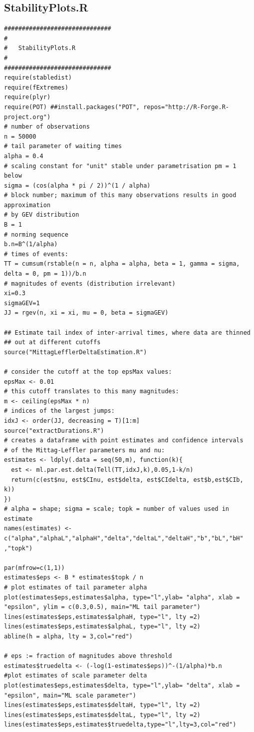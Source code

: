 \documentclass[honours,12pt]{unswthesis}
\newcommand{\1}{\mathbf 1}
\numberwithin{equation}{section}
\theoremstyle{definition}
\theoremstyle{remark}
\begin{document}
\begin{appendices}
\section{StabilityPlots.R}
\begin{lstlisting}
##############################
#
#	StabilityPlots.R
#
##############################
require(stabledist)
require(fExtremes)
require(plyr)
require(POT) ##install.packages("POT", repos="http://R-Forge.R-project.org") 
# number of observations
n = 50000
# tail parameter of waiting times
alpha = 0.4
# scaling constant for "unit" stable under parametrisation pm = 1 below
sigma = (cos(alpha * pi / 2))^(1 / alpha)
# block number; maximum of this many observations results in good approximation
# by GEV distribution
B = 1
# norming sequence
b.n=B^(1/alpha)
# times of events:
TT = cumsum(rstable(n = n, alpha = alpha, beta = 1, gamma = sigma, delta = 0, pm = 1))/b.n
# magnitudes of events (distribution irrelevant)
xi=0.3
sigmaGEV=1
JJ = rgev(n, xi = xi, mu = 0, beta = sigmaGEV)

## Estimate tail index of inter-arrival times, where data are thinned
## out at different cutoffs
source("MittagLefflerDeltaEstimation.R")

# consider the cutoff at the top epsMax values:
epsMax <- 0.01
# this cutoff translates to this many magnitudes:
m <- ceiling(epsMax * n)
# indices of the largest jumps:
idxJ <- order(JJ, decreasing = T)[1:m]
source("extractDurations.R")
# creates a dataframe with point estimates and confidence intervals
# of the Mittag-Leffler parameters mu and nu:
estimates <- ldply(.data = seq(50,m), function(k){
  est <- ml.par.est.delta(Tell(TT,idxJ,k),0.05,1-k/n)
  return(c(est$nu, est$CInu, est$delta, est$CIdelta, est$b,est$CIb, k))
})
# alpha = shape; sigma = scale; topk = number of values used in estimate
names(estimates) <- c("alpha","alphaL","alphaH","delta","deltaL","deltaH","b","bL","bH" ,"topk")

par(mfrow=c(1,1))
estimates$eps <- B * estimates$topk / n
# plot estimates of tail parameter alpha
plot(estimates$eps,estimates$alpha, type="l",ylab= "alpha", xlab = "epsilon", ylim = c(0.3,0.5), main="ML tail parameter")
lines(estimates$eps,estimates$alphaH, type="l", lty =2)
lines(estimates$eps,estimates$alphaL, type="l", lty =2)
abline(h = alpha, lty = 3,col="red")

# eps := fraction of magnitudes above threshold
estimates$truedelta <- (-log(1-estimates$eps))^-(1/alpha)*b.n
#plot estimates of scale parameter delta
plot(estimates$eps,estimates$delta, type="l",ylab= "delta", xlab = "epsilon", main="ML scale parameter")
lines(estimates$eps,estimates$deltaH, type="l", lty =2)
lines(estimates$eps,estimates$deltaL, type="l", lty =2)
lines(estimates$eps,estimates$truedelta,type="l",lty=3,col="red")




\end{lstlisting}
\end{appendices}
\end{document}
